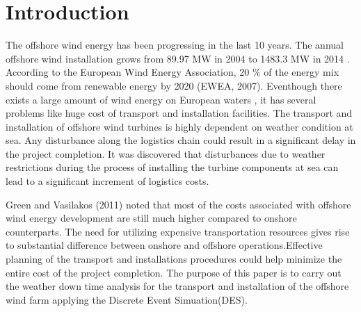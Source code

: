\section{Introduction}
The offshore wind energy has been progressing in the last 10 years. The annual offshore wind installation grows from 89.97 MW in 2004 to 1483.3 MW in 2014 \cite{Giorgio_EWEA_2015}. According to the European Wind Energy Association, 20 \% of the energy mix should come from renewable energy by 2020 (EWEA, 2007). Eventhough there exists a large amount of wind energy on European waters , it has several problems like huge cost of transport and installation facilities. The transport and installation of offshore wind turbines is highly dependent on weather condition at sea. Any disturbance along the logistics chain could result in a significant delay in the project completion. It was discovered \cite{Lange2012} that disturbances due to weather restrictions during the process of installing the turbine components at sea can lead to a significant increment of logistics costs.

Green and Vasilakos (2011) noted that most of the costs associated with offshore wind energy development are still much higher compared to onshore counterparts. The need for utilizing expensive transportation resources gives rise to substantial difference between onshore and offshore operations.Effective planning of the transport and installations procedures could help minimize the entire cost of the project completion. The purpose of this paper is to carry out the weather down time analysis for the transport and installation of the offshore wind farm applying the Discrete Event Simuation(DES).